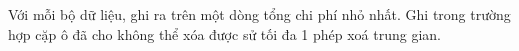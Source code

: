 Với mỗi bộ dữ liệu, ghi ra trên một dòng tổng chi phí nhỏ nhất. Ghi   trong trường hợp cặp ô đã cho không thể xóa được sử tối đa 1 phép xoá trung gian.